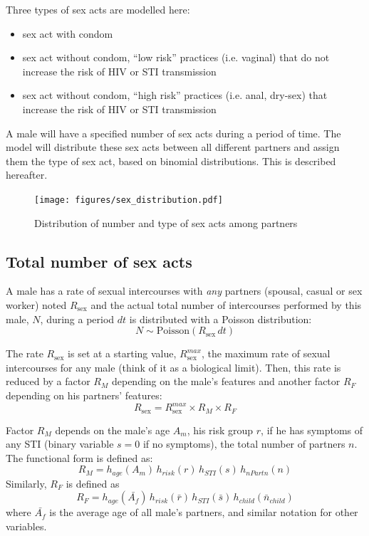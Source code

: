 \documentclass[11pt, onecolumn]{article}
\begin{document}
Three types of sex acts are modelled here:
\begin{itemize}
\item sex act with condom
\item sex act without condom, ``low risk'' practices  (i.e. vaginal) that do not increase the risk of HIV or STI transmission
\item sex act without condom, ``high risk'' practices  (i.e. anal, dry-sex) that increase the risk of HIV or STI transmission
\end{itemize}

A male will have a specified number of sex acts during a period of time. The model will distribute these sex acts between all different partners and assign them the type of sex act, based on binomial distributions. This is described hereafter.

\begin{figure}[ht]
\centering
    \texttt{[image: figures/sex\_distribution.pdf]}
\caption{Distribution of number and type of sex acts among partners}
\label{fig:sexDistribution}
\end{figure}


\subsection{Total number of sex acts}

A male has a rate of sexual intercourses with \emph{any} partners (spousal, casual or sex worker) noted $R_{\mathrm{sex}}$ and the actual total number of intercourses performed by this male, $N$, during a period $dt$ is distributed with a Poisson distribution: 
$$N\sim \mathrm{Poisson}(R_{\mathrm{sex}}\, dt)$$

The rate $R_{\mathrm{sex}}$ is set at a starting value,  $R_{\mathrm{sex}}^{max}$, the maximum rate of sexual intercourses for any male (think of it as a biological limit). Then, this rate is reduced by a factor $R_M$ depending on the male's features  and another factor $R_F$ depending on his partners' features:
$$R_{\mathrm{sex}} = R_{\mathrm{sex}}^{max} \times R_{M} \times R_{F} $$

Factor $R_M$ depends on the male's age $A_m$, his risk group $r$, if he has symptoms of any STI (binary variable $s=0$ if no symptoms), the total number of partners $n$. The functional form is defined as:
$$R_M= h_{age}(A_m)  \, h_{risk}(r)  \,h_{STI}(s) \,h_{nPartn}(n) $$
Similarly, $R_F$ is defined as
$$R_F=  h_{age}(\bar{A_f})  \, h_{risk}(\bar{r})  \,h_{STI}(\bar{s}) \,h_{child}(\bar{n}_{child})$$
where $\bar{A_f}$ is the average age of all male's partners, and similar notation for other variables.
\end{document}
